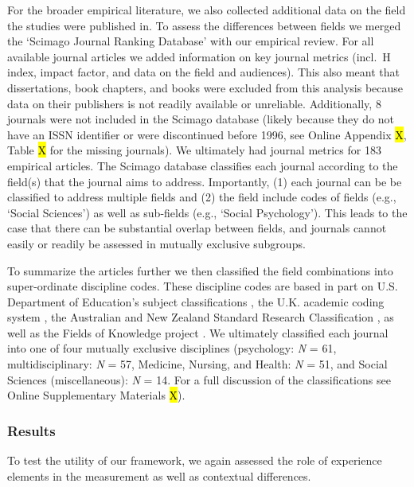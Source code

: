 For the broader empirical literature, we also collected additional data
on the field the studies were published in. To assess the differences
between fields we merged the `Scimago Journal Ranking Database'
\citep{SCImago2020} with our empirical review. For all available journal
articles we added information on key journal metrics (incl.~H index,
impact factor, and data on the field and audiences). This also meant
that dissertations, book chapters, and books were excluded from this
analysis because data on their publishers is not readily available or
unreliable. Additionally, 8 journals were not included in the Scimago
database (likely because they do not have an ISSN identifier or were
discontinued before 1996, see Online Appendix \hl{X}, Table \hl{X} for
the missing journals). We ultimately had journal metrics for 183
empirical articles. The Scimago database classifies each journal
according to the field(s) that the journal aims to address. Importantly,
(1) each journal can be be classified to address multiple fields and (2)
the field include codes of fields (e.g., `Social Sciences') as well as
sub-fields (e.g., `Social Psychology'). This leads to the case that
there can be substantial overlap between fields, and journals cannot
easily or readily be assessed in mutually exclusive subgroups.

To summarize the articles further we then classified the field
combinations into super-ordinate discipline codes. These discipline
codes are based in part on U.S. Department of Education's subject
classifications \citep[i.e., CIP;][]{InstituteofEducationSciences2020},
the U.K. academic coding system
\citep[JACS 3.0;][]{HigherEducationStatisticsAgency2013}, the Australian
and New Zealand Standard Research Classification
\citep[ANZSRC 2020;][]{AustralianBureauofStatistics2020}, as well as the
Fields of Knowledge project \citep{ThingsmadeThinkable2014}. We
ultimately classified each journal into one of four mutually exclusive
disciplines (psychology: \textit{N} = 61, multidisciplinary: \textit{N}
= 57, Medicine, Nursing, and Health: \textit{N} = 51, and Social
Sciences (miscellaneous): \textit{N} = 14. For a full discussion of the
classifications see Online Supplementary Materials \hl{X}).

\subsubsection{Results}

To test the utility of our framework, we again assessed the role of
experience elements in the measurement as well as contextual
differences.

